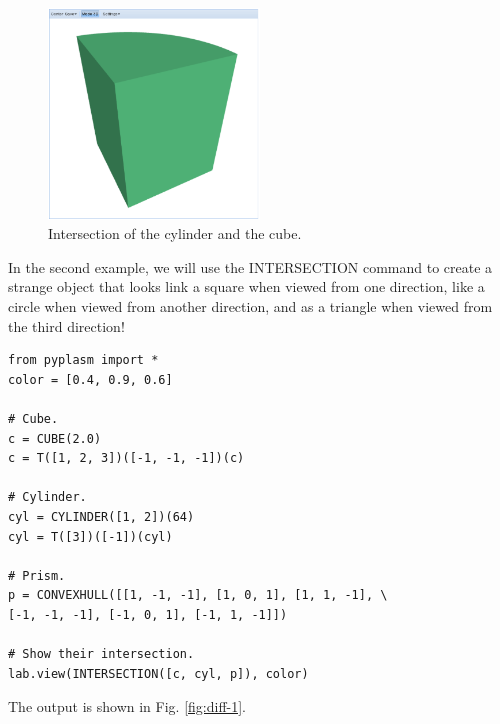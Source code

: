 \documentclass{article}
\begin{document}
\newpage

\begin{figure}[!ht]
\begin{center}
\includegraphics[width=0.5\textwidth]{img/int-2.png}
\end{center}
\vspace{-2mm}
\caption{Intersection of the cylinder and the cube.}
\label{fig:int-2}
\end{figure}
\noindent
In the second example, we will use the INTERSECTION command to create 
a strange object that looks link a square when viewed
from one direction, like a circle when viewed from another direction, 
and as a triangle when viewed from the third direction!


\begin{verbatim}
from pyplasm import *
color = [0.4, 0.9, 0.6]

# Cube.
c = CUBE(2.0)
c = T([1, 2, 3])([-1, -1, -1])(c)

# Cylinder.
cyl = CYLINDER([1, 2])(64)
cyl = T([3])([-1])(cyl)

# Prism.
p = CONVEXHULL([[1, -1, -1], [1, 0, 1], [1, 1, -1], \
[-1, -1, -1], [-1, 0, 1], [-1, 1, -1]])

# Show their intersection.
lab.view(INTERSECTION([c, cyl, p]), color)
\end{verbatim}
The output is shown in Fig. \ref{fig:diff-1}.
\end{document}

